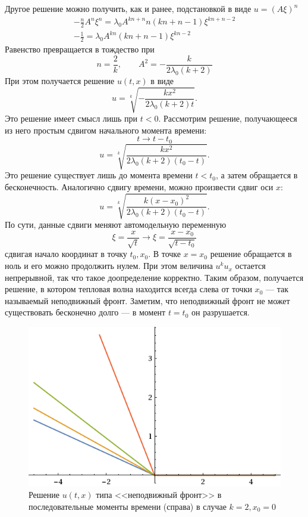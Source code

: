 \documentclass[12pt]{article}
\begin{document}
Другое решение можно получить, как и ранее, подстановкой в виде $u = (A\xi)^{n}$
\begin{gather*}
-\frac{n}{2} A^n \xi^{n} = \lambda_0 A^{kn+n} n (kn+n-1) \xi^{kn+n-2}\\
-\frac{1}{2} = \lambda_0 A^{kn} (kn+n-1) \xi^{kn-2}
\end{gather*}
Равенство превращается в тождество при 
\[
n = \frac{2}{k}, \qquad A^2 = -\frac{k}{2\lambda_0 (k+2)}
\]
При этом получается решение $u(t, x)$ в виде
\[
u = \sqrt[k]{-\frac{kx^2}{2\lambda_0(k+2)t}}.
\]
Это решение имеет смысл лишь при $t < 0$.
Рассмотрим решение, получающееся из него простым сдвигом начального момента времени:
\[
t \to t - t_0
\]
\[
u = \sqrt[k]{\frac{kx^2}{2\lambda_0(k+2)(t_0 - t)}}.
\]
Это решение существует лишь до момента времени $t < t_0$, а затем обращается в бесконечность. Аналогично сдвигу времени, можно произвести сдвиг оси $x$:
\[
u = \sqrt[k]{\frac{k(x-x_0)^2}{2\lambda_0(k+2)(t_0 - t)}}.
\]
По сути, данные сдвиги меняют автомодельную переменную
\[
\xi = \frac{x}{\sqrt{t}} \to \xi = \frac{x-x_0}{\sqrt{t - t_0}}
\]
сдвигая начало координат в точку $t_0, x_0$.
В точке $x = x_0$ решение обращается в ноль и его можно продолжить нулем. При этом величина $u^k u_x$  остается непрерывной, так что такое доопределение корректно. Таким образом, получается решение, в котором тепловая волна находится всегда слева от точки $x_0$ --- так называемый неподвижный фронт. Заметим, что неподвижный фронт не может существовать бесконечно долго --- в момент $t = t_0$ он разрушается.
\begin{figure}[ht!]
\centering
\includegraphics[width=.45\textwidth]{breaking.png}
\caption{Решение $u(t,x)$ типа <<неподвижный фронт>> в последовательные моменты времени (справа) в случае $k = 2, x_0 = 0$}
\end{figure}
\end{document}
